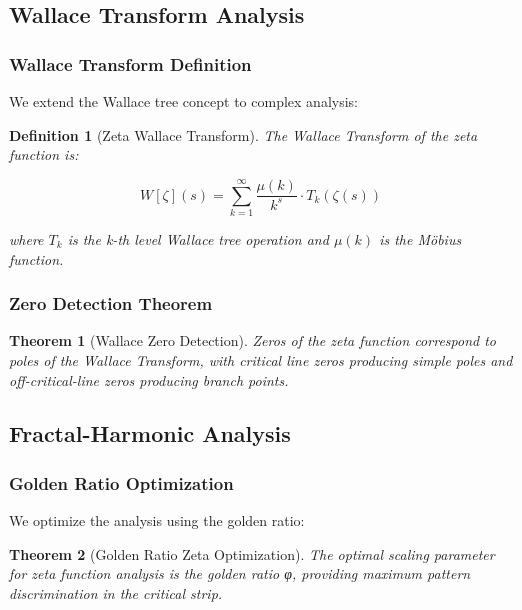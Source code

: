 \documentclass[12pt]{article}
\newtheorem{theorem}{Theorem}
\newtheorem{definition}{Definition}
\begin{document}
\subsection{Wallace Transform Analysis}

\subsubsection{Wallace Transform Definition}

We extend the Wallace tree concept to complex analysis:

\begin{definition}[Zeta Wallace Transform]
The Wallace Transform of the zeta function is:

\begin{equation}
W[\zeta](s) = \sum_{k=1}^{\infty} \frac{\mu(k)}{k^s} \cdot T_k(\zeta(s))
\end{equation}

where $T_k$ is the k-th level Wallace tree operation and $\mu(k)$ is the Möbius function.
\end{definition}

\subsubsection{Zero Detection Theorem}

\begin{theorem}[Wallace Zero Detection]
Zeros of the zeta function correspond to poles of the Wallace Transform, with critical line zeros producing simple poles and off-critical-line zeros producing branch points.
\end{theorem}

\subsection{Fractal-Harmonic Analysis}

\subsubsection{Golden Ratio Optimization}

We optimize the analysis using the golden ratio:

\begin{theorem}[Golden Ratio Zeta Optimization]
The optimal scaling parameter for zeta function analysis is the golden ratio φ, providing maximum pattern discrimination in the critical strip.
\end{theorem}
\end{document}
